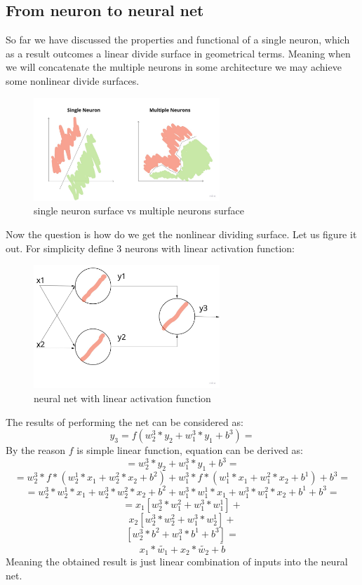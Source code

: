 \subsection{From neuron to neural net}
So far we have discussed the properties and functional of a single neuron, which as a result outcomes a linear divide surface in geometrical terms. Meaning when we will concatenate the multiple neurons in some architecture we may achieve some nonlinear divide surfaces.
\begin{figure}[h]
    \centering \includegraphics[width=7cm]{images/neuron_to_neural_net.jpg}
    \caption {single neuron surface vs multiple neurons surface}
\end{figure}

Now the question is how do we get the nonlinear dividing surface. Let us figure it out.
For simplicity define 3 neurons with linear activation function:
\begin{figure}[h]
    \centering \includegraphics[width=7cm]{images/3_neurons_net.jpg}
    \caption {neural net with linear activation function}
\end{figure}
The results of performing the net can be considered as:
\[ y_3 = f(w_2^3*y_2+ w_1^3*y_1+b^3) = \]
By the reason $f$ is simple linear function, equation can be derived as:
\[ = w_2^3*y_2+ w_1^3*y_1+b^3 = \] 
\[ = w_2^3*f*(w_2^1*x_1+w_2^2*x_2+b^2) + w_1^3*f*(w_1^1*x_1+w_1^2*x_2+b^1) + b^3 = \]   
\[ = w_2^3*w_2^1*x_1+w_2^3*w_2^2*x_2+b^2 + w_1^3*w_1^1*x_1+w_1^3*w_1^2*x_2+b^1+ b^3 = \]
\[ = x_1[w_2^3*w_1^2 + w_1^3*w_1^1] + \]
\[   x_2[w_2^3*w_2^2 + w_1^3*w_2^1] + \]
\[   [w_2^3*b^2 + w_1^3*b^1 + b^3]  = \]
\[   x_1*\tilde{w_1} + x_2*\tilde{w_2} + \tilde{b} \]
Meaning the obtained result is just linear combination of inputs into the neural net. 

